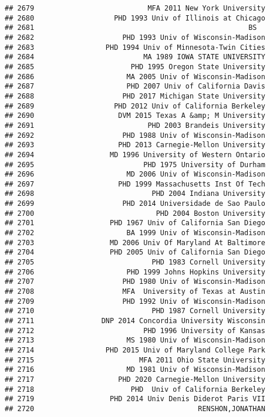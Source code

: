 \documentclass[
]{article}
\begin{document}
\begin{verbatim}
## 2679                           MFA 2011 New York University
## 2680                   PHD 1993 Univ of Illinois at Chicago
## 2681                                                   BS  
## 2682                     PHD 1993 Univ of Wisconsin-Madison
## 2683                 PHD 1994 Univ of Minnesota-Twin Cities
## 2684                          MA 1989 IOWA STATE UNIVERSITY
## 2685                       PHD 1995 Oregon State University
## 2686                      MA 2005 Univ of Wisconsin-Madison
## 2687                      PHD 2007 Univ of California Davis
## 2688                     PHD 2017 Michigan State University
## 2689                   PHD 2012 Univ of California Berkeley
## 2690                    DVM 2015 Texas A &amp; M University
## 2691                           PHD 2003 Brandeis University
## 2692                     PHD 1988 Univ of Wisconsin-Madison
## 2693                    PHD 2013 Carnegie-Mellon University
## 2694                  MD 1996 University of Western Ontario
## 2695                          PHD 1975 University of Durham
## 2696                      MD 2006 Univ of Wisconsin-Madison
## 2697                    PHD 1999 Massachusetts Inst Of Tech
## 2698                            PHD 2004 Indiana University
## 2699                     PHD 2014 Universidade de Sao Paulo
## 2700                             PHD 2004 Boston University
## 2701                  PHD 1967 Univ of California San Diego
## 2702                      BA 1999 Univ of Wisconsin-Madison
## 2703                  MD 2006 Univ Of Maryland At Baltimore
## 2704                  PHD 2005 Univ of California San Diego
## 2705                            PHD 1983 Cornell University
## 2706                      PHD 1999 Johns Hopkins University
## 2707                     PHD 1980 Univ of Wisconsin-Madison
## 2708                     MFA  University of Texas at Austin
## 2709                     PHD 1992 Univ of Wisconsin-Madison
## 2710                            PHD 1987 Cornell University
## 2711                DNP 2014 Concordia University Wisconsin
## 2712                          PHD 1996 University of Kansas
## 2713                      MS 1980 Univ of Wisconsin-Madison
## 2714                 PHD 2015 Univ of Maryland College Park
## 2715                         MFA 2011 Ohio State University
## 2716                      MD 1981 Univ of Wisconsin-Madison
## 2717                    PHD 2020 Carnegie-Mellon University
## 2718                       PHD  Univ of California Berkeley
## 2719                  PHD 2014 Univ Denis Diderot Paris VII
## 2720                                       RENSHON,JONATHAN

\end{verbatim}
\end{document}
